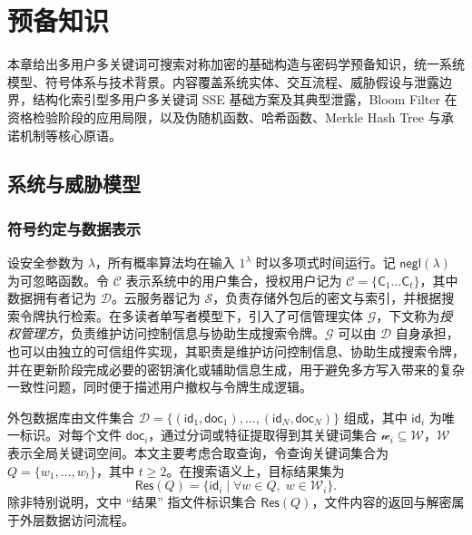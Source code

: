 \chapter{预备知识}
本章给出多用户多关键词可搜索对称加密的基础构造与密码学预备知识，统一系统模型、符号体系与技术背景。内容覆盖系统实体、交互流程、威胁假设与泄露边界，结构化索引型多用户多关键词 SSE 基础方案及其典型泄露，Bloom Filter 在资格检验阶段的应用局限，以及伪随机函数、哈希函数、Merkle Hash Tree 与承诺机制等核心原语。\cite{bloom1970,merkle1979,naor1991}
\section{系统与威胁模型}
\subsection{符号约定与数据表示}
设安全参数为 $\lambda$，所有概率算法均在输入 $1^\lambda$ 时以多项式时间运行。记 $\mathsf{negl}(\lambda)$ 为可忽略函数。令 $\mathcal{C}$ 表示系统中的用户集合，授权用户记为 $\mathcal{C}=\{\mathsf{C}_1\dots\mathsf{C}_t\}$，其中数据拥有者记为 $\mathcal{D}$。云服务器记为 $\mathcal{S}$，负责存储外包后的密文与索引，并根据搜索令牌执行检索。在多读者单写者模型下，引入了可信管理实体 $\mathcal{G}$，下文称为\emph{授权管理方}，负责维护访问控制信息与协助生成搜索令牌。$\mathcal{G}$ 可以由 $\mathcal{D}$ 自身承担，也可以由独立的可信组件实现，其职责是维护访问控制信息、协助生成搜索令牌，并在更新阶段完成必要的密钥演化或辅助信息生成，用于避免多方写入带来的复杂一致性问题，同时便于描述用户撤权与令牌生成逻辑。\cite{cash2014}

外包数据库由文件集合 $\mathcal{D}=\{(\mathsf{id}_1,\mathsf{doc}_1),\ldots,(\mathsf{id}_N,\mathsf{doc}_N)\}$ 组成，其中 $\mathsf{id}_i$ 为唯一标识。对每个文件 $\mathsf{doc}_i$，通过分词或特征提取得到其关键词集合 $\mathcal{w}_i\subseteq \mathcal{W}$，$\mathcal{W}$ 表示全局关键词空间。本文主要考虑合取查询，令查询关键词集合为 $Q=\{w_1,\ldots,w_t\}$，其中 $t\ge 2$。在搜索语义上，目标结果集为
\begin{equation}
\mathsf{Res}(Q)=\{\mathsf{id}_i\mid \forall w\in Q,\; w\in\mathcal{W}_i\}.
\end{equation}
除非特别说明，文中 ``结果'' 指文件标识集合 $\mathsf{Res}(Q)$，文件内容的返回与解密属于外层数据访问流程。

